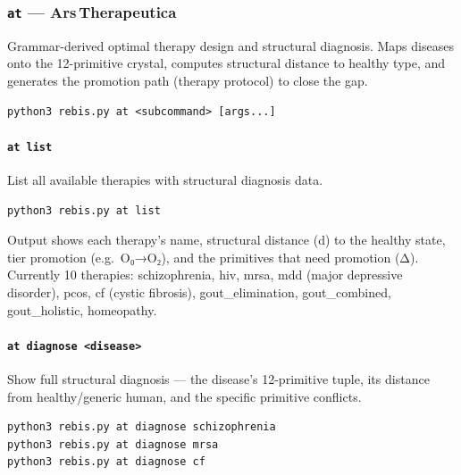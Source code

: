 \hypertarget{at-ars-therapeutica}{%
\subsubsection{\texorpdfstring{\texttt{at} ---
Ars\,Therapeutica}{at --- Ars\,Therapeutica}}\label{at-ars-therapeutica}}

Grammar-derived optimal therapy design and structural diagnosis. Maps
diseases onto the 12-primitive crystal, computes structural distance to
healthy type, and generates the promotion path (therapy protocol) to
close the gap.

\begin{verbatim}
python3 rebis.py at <subcommand> [args...]
\end{verbatim}

\hypertarget{at-list}{%
\paragraph{\texorpdfstring{\texttt{at\ list}}{at list}}\label{at-list}}

List all available therapies with structural diagnosis data.

\begin{verbatim}
python3 rebis.py at list
\end{verbatim}

Output shows each therapy's name, structural distance (d) to the healthy
state, tier promotion (e.g.~O₀→O₂), and the primitives that need
promotion (Δ). Currently 10 therapies: schizophrenia, hiv, mrsa, mdd
(major depressive disorder), pcos, cf (cystic fibrosis),
gout\_elimination, gout\_combined, gout\_holistic, homeopathy.

\hypertarget{at-diagnose-disease}{%
\paragraph{\texorpdfstring{\texttt{at\ diagnose\ \textless{}disease\textgreater{}}}{at diagnose \textless disease\textgreater{}}}\label{at-diagnose-disease}}

Show full structural diagnosis --- the disease's 12-primitive tuple, its
distance from healthy/generic human, and the specific primitive
conflicts.

\begin{verbatim}
python3 rebis.py at diagnose schizophrenia
python3 rebis.py at diagnose mrsa
python3 rebis.py at diagnose cf
\end{verbatim}

